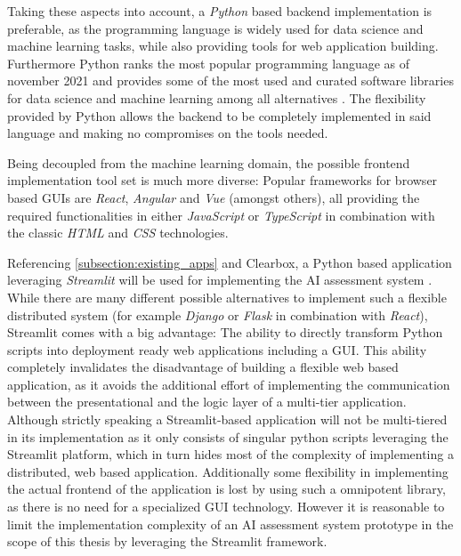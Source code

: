 \documentclass[11pt,a4paper,english]{scrreprt}
\begin{document}
Taking these aspects into account, a \textit{Python} based backend implementation is preferable, as the programming language is widely used for data science and machine learning tasks, while also providing tools for web application building. Furthermore Python ranks the most popular programming language as of november 2021 and provides some of the most used and curated software libraries for data science and machine learning among all alternatives \parencite{toibe_index_python_website,numpy_github,pandas_github,pytorch_website}. The flexibility provided by Python allows the backend to be completely implemented in said language and making no compromises on the tools needed.

Being decoupled from the machine learning domain, the possible frontend implementation tool set is much more diverse: Popular frameworks for browser based GUIs are \textit{React}, \textit{Angular} and \textit{Vue} (amongst others), all providing the required functionalities in either \textit{JavaScript} or \textit{TypeScript} in combination with the classic \textit{HTML} and \textit{CSS} technologies.

Referencing \autoref{subsection:existing_apps} and Clearbox, a Python based application leveraging \textit{Streamlit} will be used for implementing the AI assessment system \parencite{streamlit_website}. While there are many different possible alternatives to implement such a flexible distributed system (for example \textit{Django} or \textit{Flask} in combination with \textit{React}), Streamlit comes with a big advantage: The ability to directly transform Python scripts into deployment ready web applications including a GUI. This ability completely invalidates the disadvantage of building a flexible web based application, as it avoids the additional effort of implementing the communication between the presentational and the logic layer of a multi-tier application. Although strictly speaking a Streamlit-based application will not be multi-tiered in its implementation as it only consists of singular python scripts leveraging the Streamlit platform, which in turn hides most of the complexity of implementing a distributed, web based application. Additionally some flexibility in implementing the actual frontend of the application is lost by using such a omnipotent library, as there is no need for a specialized GUI technology. However it is reasonable to limit the implementation complexity of an AI assessment system prototype in the scope of this thesis by leveraging the Streamlit framework.
\end{document}
